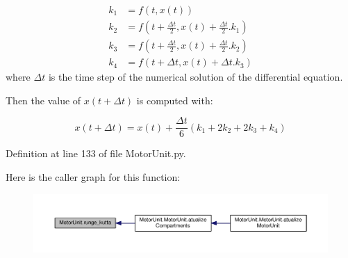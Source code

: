 \begin{align} k_1 &= f(t,x(t))\\ k_2 &= f(t+\frac{\Delta t}{2}, x(t) + \frac{\Delta t}{2}.k_1)\\ k_3 &= f(t+\frac{\Delta t}{2}, x(t) + \frac{\Delta t}{2}.k_2)\\ k_4 &= f(t+\Delta t, x(t) + \Delta t.k_3) \end{align} where $\Delta t$ is the time step of the numerical solution of the differential equation.

Then the value of $x(t+\Delta t)$ is computed with\-:

\begin{equation} x(t+\Delta t) = x(t) + \frac{\Delta t}{6}(k_1 + 2k_2 + 2k_3+k_4) \end{equation} 

Definition at line 133 of file Motor\-Unit.\-py.



Here is the caller graph for this function\-:\nopagebreak
\begin{figure}[H]
\begin{center}
\leavevmode
\includegraphics[width=350pt]{namespace_motor_unit_ad34c81597ff5e9cdcf53fd13e78d2d6c_icgraph}
\end{center}
\end{figure}


